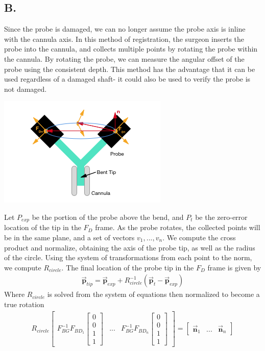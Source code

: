 \documentclass[letterpaper, 11pt]{article}
\newcommand{\vect}[1]{\boldsymbol{\vec #1}}
\begin{document}
\subsection*{B.}
Since the probe is damaged, we can no longer assume the probe axis is inline with the cannula axis. In this method of registration, the surgeon inserts the probe into the cannula, and collects multiple points by rotating the probe within the cannula. By rotating the probe, we can measure the angular offset of the probe using the consistent depth. This method has the advantage that it can be used regardless of a damaged shaft- it could also be used to verify the probe is not damaged.
\begin{center}\includegraphics[scale=1]{Circle_in_Space.png}\end{center}
Let $P_{exp}$ be the portion of the probe above the bend, and $P_t$ be the zero-error location of the tip in the $F_D$ frame. As the probe rotates, the collected points will be in the same plane, and a set of vectors $v_1,...,v_n$.  We compute the cross product and normalize, obtaining the axis of the probe tip, as well as the radius of the circle. Using the system of transformations from each point to the norm, we compute $R_{circle}$. The final location of the probe tip in the $F_D$ frame is given by
\begin{align}
\vect p_{tip} = \vect p_{exp} + R_{circle}^{-1}(\vect p_t - \vect p_{exp})
\end{align}
Where $R_{circle}$ is solved from the system of equations then normalized to become a true rotation
\begin{align}
R_{circle}
\begin{bmatrix}
F_{BG}^{-1}F_{BD_1} \begin{bmatrix} 0 \\ 0 \\ 1 \\ 1 \end{bmatrix}
& ... &
F_{BG}^{-1}F_{BD_n} \begin{bmatrix} 0 \\ 0 \\ 1 \\ 1 \end{bmatrix}
\end{bmatrix}
= \begin{bmatrix}
\vect n_1 & ... & \vect n_n
\end{bmatrix}
\end{align}
\end{document}

